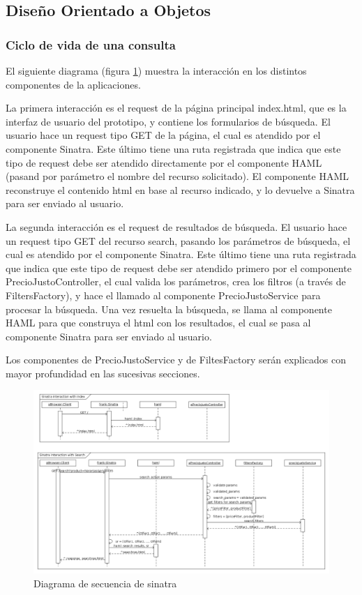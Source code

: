 \subsection{Diseño Orientado a Objetos}

\subsubsection{Ciclo de vida de una consulta}

El siguiente diagrama (figura \ref{fig:sequence_sinatra}) muestra la interacci\'on en los distintos componentes de la aplicaciones.

La primera interacci\'on es el request de la p\'agina principal index.html, que es la interfaz de usuario del prototipo, y contiene los formularios de b\'usqueda. El usuario hace un request tipo GET de la p\'agina, el cual es atendido por el componente Sinatra. Este \'ultimo tiene una ruta registrada que indica que este tipo de request debe ser atendido directamente por el componente HAML (pasand por par\'ametro el nombre del recurso solicitado). El componente HAML reconstruye el contenido html en base al recurso indicado, y lo devuelve a Sinatra para ser enviado al usuario.

La segunda interacci\'on es el request de resultados de b\'usqueda. El usuario hace un request tipo GET del recurso search, pasando los par\'ametros de b\'usqueda, el cual es atendido por el componente Sinatra. Este \'ultimo tiene una ruta registrada que indica que este tipo de request debe ser atendido primero por el componente PrecioJustoController, el cual valida los par\'ametros, crea los filtros (a trav\'es de FiltersFactory), y hace el llamado al componente PrecioJustoService para procesar la b\'usqueda. Una vez resuelta la b\'usqueda, se llama al componente HAML para que construya el html con los resultados, el cual se pasa al componente Sinatra para ser enviado al usuario.

Los componentes de PrecioJustoService y de FiltesFactory ser\'an explicados con mayor profundidad en las sucesivas secciones.

\begin{figure}[h]
\centerline{\includegraphics[width=0.6\paperwidth]{./imgs/sequence_diagram_sinatra.png}}
\caption{Diagrama de secuencia de sinatra}
\label{fig:sequence_sinatra}
\end{figure}


